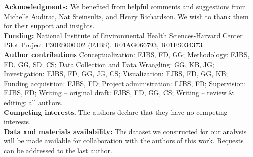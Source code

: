 \documentclass[12pt]{article}
\begin{document}





\noindent \textbf{Acknowledgments:} We benefited from helpful comments and suggestions from Michelle Audirac, Nat Steinsultz, and Henry Richardson. We wish to thank them for their support and insights.\\

\noindent \textbf{Funding:} National Institute of Environmental Health Sciences-Harvard Center Pilot Project P30ES000002 (FJBS). R01AG066793, R01ES034373. \vspace{1cm}\\
\noindent \textbf{Author contributions}
Conceptualization: FJBS, FD, GG; 
Methodology: FJBS, FD, GG, SD, CS; 
Data Collection and Data Wrangling: GG, KB, JG;
Investigation: FJBS, FD, GG, JG, CS; 
Visualization: FJBS, FD, GG, KB; 
Funding acquisition: FJBS, FD; 
Project administration: FJBS, FD; 
Supervision: FJBS, FD;
Writing – original draft: FJBS, FD, GG, CS;
Writing – review \& editing:  all authors.
\vspace{1cm}\\
\textbf{Competing interests:} The authors declare that they have no competing interests.
\vspace{1cm}\\
\textbf{Data and materials availability:} The dataset we constructed for our analysis will be made available for collaboration with the authors of this work. Requests can be addressed to the last author. 
\end{document}
